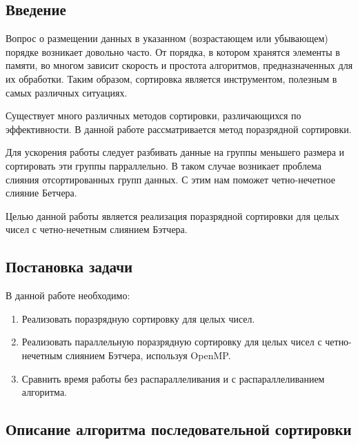 \documentclass{report}
\begin{document}
\setcounter{page}{2}

\tableofcontents

\newpage
\begin{center}
\section*{Введение}
\end{center}

Вопрос о размещении данных в указанном (возрастающем или убывающем) порядке возникает довольно часто. От порядка, в котором хранятся элементы в памяти, во многом зависит скорость и простота алгоритмов, предназначенных для их обработки. Таким образом, сортировка является инструментом, полезным в самых различных ситуациях.
\par Существует много различных методов сортировки, различающихся по эффективности. В данной работе рассматривается метод поразрядной сортировки.
\par Для ускорения работы следует разбивать данные на группы меньшего размера и сортировать эти группы парраллельно. В таком случае возникает проблема слияния отсортированных групп данных. С этим нам поможет четно-нечетное слияние Бетчера.
\par Целью данной работы является реализация поразрядной сортировки для целых чисел с четно-нечетным слиянием Бэтчера. 

\newpage
\begin{center}
\section*{Постановка задачи}
\end{center}

В данной работе необходимо:
\begin{enumerate}
\item Реализовать поразрядную сортировку для целых чисел.
\item Реализовать параллельную поразрядную сортировку для целых чисел с четно-нечетным слиянием Бэтчера, используя OpenMP. 
\item Сравнить время работы без распараллеливания и с распараллеливанием алгоритма.
\end{enumerate}

\newpage
\begin{center}
\section*{Описание алгоритма последовательной сортировки}
\end{center}
\end{document}
